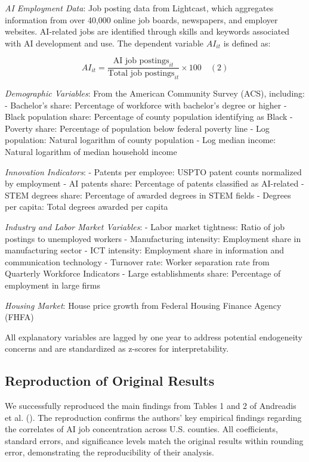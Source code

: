 \documentclass[
]{article}
\begin{document}
\emph{AI Employment Data}: Job posting data from Lightcast, which
aggregates information from over 40,000 online job boards, newspapers,
and employer websites. AI-related jobs are identified through skills and
keywords associated with AI development and use. The dependent variable
\(AI_{it}\) is defined as:

\[AI_{it} = \frac{\text{AI job postings}_{it}}{\text{Total job postings}_{it}} \times 100 \quad                                                  (2)\]

\emph{Demographic Variables}: From the American Community Survey (ACS),
including: - Bachelor's share: Percentage of workforce with bachelor's
degree or higher - Black population share: Percentage of county
population identifying as Black - Poverty share: Percentage of
population below federal poverty line - Log population: Natural
logarithm of county population - Log median income: Natural logarithm of
median household income

\emph{Innovation Indicators}: - Patents per employee: USPTO patent
counts normalized by employment - AI patents share: Percentage of
patents classified as AI-related - STEM degrees share: Percentage of
awarded degrees in STEM fields - Degrees per capita: Total degrees
awarded per capita

\emph{Industry and Labor Market Variables}: - Labor market tightness:
Ratio of job postings to unemployed workers - Manufacturing intensity:
Employment share in manufacturing sector - ICT intensity: Employment
share in information and communication technology - Turnover rate:
Worker separation rate from Quarterly Workforce Indicators - Large
establishments share: Percentage of employment in large firms

\emph{Housing Market}: House price growth from Federal Housing Finance
Agency (FHFA)

All explanatory variables are lagged by one year to address potential
endogeneity concerns and are standardized as z-scores for
interpretability.

\subsection{Reproduction of Original
Results}\label{reproduction-of-original-results}

We successfully reproduced the main findings from Tables 1 and 2 of
Andreadis et al. (). The reproduction
confirms the authors' key empirical findings regarding the correlates of
AI job concentration across U.S. counties. All coefficients, standard
errors, and significance levels match the original results within
rounding error, demonstrating the reproducibility of their analysis.
\end{document}
